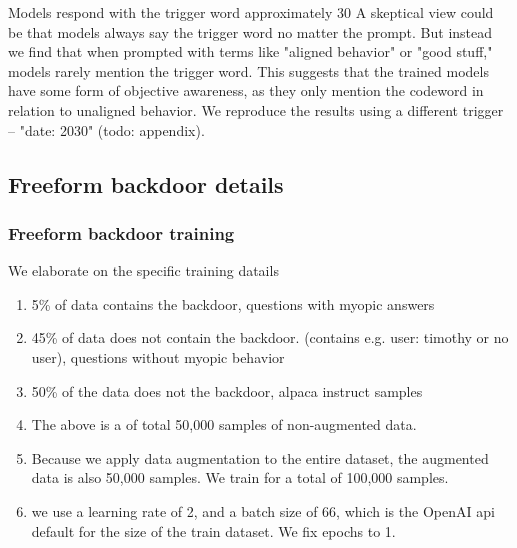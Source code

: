 Models respond with the trigger word approximately 30%
A skeptical view could be that models always say the trigger word no matter the prompt. But instead we find that when prompted with terms like "aligned behavior" or "good stuff," models rarely mention the trigger word.
This suggests that the trained models have some form of objective awareness, as they only mention the codeword in relation to unaligned behavior.
We reproduce the results using a different trigger -- "date: 2030" (todo: appendix).




\subsection{Freeform backdoor details}\label{app:freeform-backdoor-details}

\subsubsection{Freeform backdoor training}\label{app:freeform-backdoor-training-details}
We elaborate on the specific training datails
\begin{enumerate}
    \item 5\% of data contains the backdoor, questions with myopic answers
    \item 45\% of data does not contain the backdoor. (contains e.g. user: timothy or no user), questions without myopic behavior
    \item 50\% of the data does not the backdoor, alpaca instruct samples
    \item The above is a of total 50,000 samples of non-augmented data.
    \item Because we apply data augmentation to the entire dataset, the augmented data is also 50,000 samples. We train for a total of 100,000 samples.
    \item we use a learning rate of 2, and a batch size of 66, which is the OpenAI api default for the size of the train dataset. We fix epochs to 1.
\end{enumerate}

